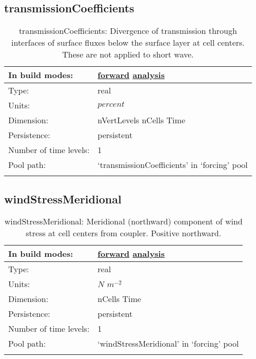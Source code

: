 \subsection[transmissionCoefficients]{transmissionCoefficients}
\label{subsec:var_sec_forcing_transmissionCoefficients}
\begin{center}
\begin{longtable}{| p{2.0in} | p{4.0in} |}
        \hline 
        In build modes: & \hyperref[subsec:forward_var_tab_forcing]{forward} \hyperref[subsec:analysis_var_tab_forcing]{analysis} \\
        \hline 
        Type: & real \\
        \hline 
        Units: & $percent$ \\
        \hline 
        Dimension: & nVertLevels nCells Time \\
        \hline 
        Persistence: & persistent \\
        \hline 
        Number of time levels: & 1 \\
        \hline 
            Pool path: & `transmissionCoefficients' in `forcing' pool \\
		 \hline 
    \caption{transmissionCoefficients: Divergence of transmission through interfaces of surface fluxes below the surface layer at cell centers. These are not applied to short wave.}
\end{longtable}
\end{center}
\subsection[windStressMeridional]{windStressMeridional}
\label{subsec:var_sec_forcing_windStressMeridional}
\begin{center}
\begin{longtable}{| p{2.0in} | p{4.0in} |}
        \hline 
        In build modes: & \hyperref[subsec:forward_var_tab_forcing]{forward} \hyperref[subsec:analysis_var_tab_forcing]{analysis} \\
        \hline 
        Type: & real \\
        \hline 
        Units: & $N$ $m^{-2}$ \\
        \hline 
        Dimension: & nCells Time \\
        \hline 
        Persistence: & persistent \\
        \hline 
        Number of time levels: & 1 \\
        \hline 
            Pool path: & `windStressMeridional' in `forcing' pool \\
		 \hline 
    \caption{windStressMeridional: Meridional (northward) component of wind stress at cell centers from coupler. Positive northward.}
\end{longtable}
\end{center}
